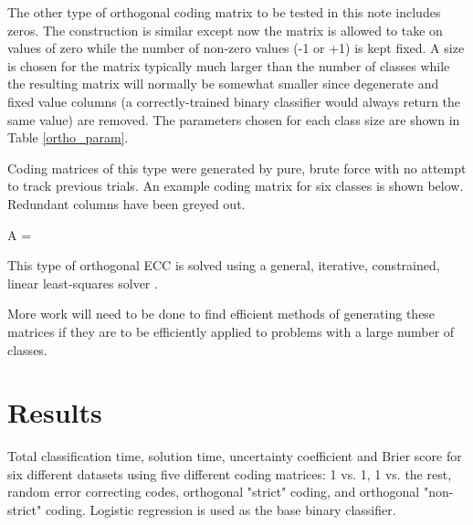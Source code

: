The other type of orthogonal coding matrix to be tested in this note
includes zeros.
The construction is similar except now the matrix is allowed to take on values
of zero while the number of non-zero values (-1 or +1) is kept fixed.
A size is chosen for the matrix typically much larger than the number of
classes while the resulting matrix will normally be somewhat smaller since
degenerate and fixed value columns (a correctly-trained binary classifier would always return the same value) are removed.
The parameters chosen for each class size are shown in Table
\ref{ortho_param}.

Coding matrices of this type were generated by pure, brute force with no
attempt to track previous trials.
An example coding matrix for six classes is shown below.
Redundant columns have been greyed out.
\begin{eqnnon}
	A = 
\end{eqnnon}
This type of orthogonal ECC is solved using a general, iterative,
constrained, linear least-squares solver \citep{Lawson_Hanson1995}.

More work will need to be done to find efficient methods
of generating these matrices
if they are to be efficiently applied to problems with a large number of classes.


\section{Results}

\begin{table*}
\caption{Total classification time, solution time, uncertainty coefficient and Brier score for six different datasets using five different coding matrices: 1 vs. 1, 1 vs. the rest, random error correcting codes, orthogonal "strict" coding, and orthogonal "non-strict" coding. Logistic regression is used as the base binary classifier.}\label{class_results_lin}

\end{table*}

